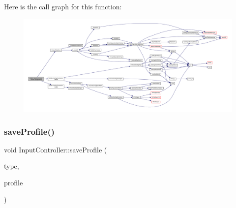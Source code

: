 Here is the call graph for this function\+:
\nopagebreak
\begin{figure}[H]
\begin{center}
\leavevmode
\includegraphics[width=350pt]{class_q_g_b_a_1_1_input_controller_a161357b346c5e579e79ad28c6b6c4686_cgraph}
\end{center}
\end{figure}
\mbox{\label{class_q_g_b_a_1_1_input_controller_a9efdf161c3186274d0ddcaa1f4e9e56b}} 
\subsubsection{\texorpdfstring{save\+Profile()}{saveProfile()}}
{\footnotesize\ttfamily void Input\+Controller\+::save\+Profile (\begin{DoxyParamCaption}\item[{uint32\+\_\+t}]{type,  }\item[{const Q\+String \&}]{profile }\end{DoxyParamCaption})}

